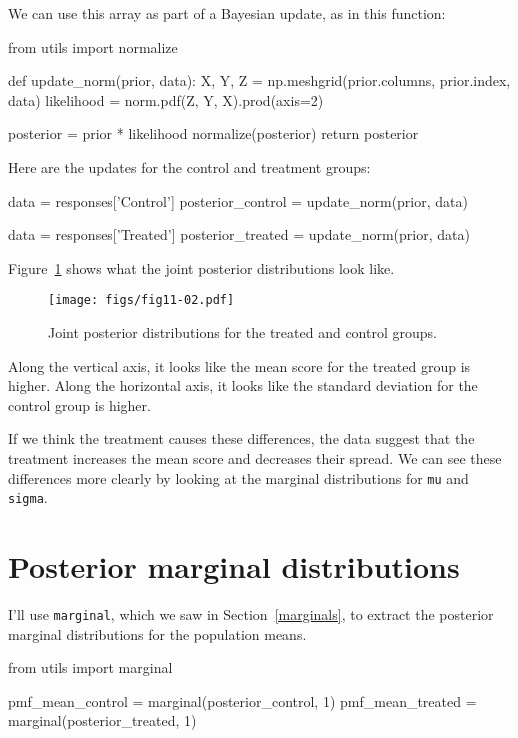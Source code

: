 \documentclass[12pt]{book}
\theoremstyle{exercise}
\newcommand{\py}[1]{{\tt #1}}%
\begin{document}
We can use this array as part of a Bayesian update, as in this function:

\begin{code}
from utils import normalize

def update_norm(prior, data):
    X, Y, Z = np.meshgrid(prior.columns, prior.index, data)
    likelihood = norm.pdf(Z, Y, X).prod(axis=2)

    posterior = prior * likelihood
    normalize(posterior)
    return posterior
\end{code}

Here are the updates for the control and treatment groups:

\begin{code}
data = responses['Control']
posterior_control = update_norm(prior, data)

data = responses['Treated']
posterior_treated = update_norm(prior, data)
\end{code}

Figure~\ref{fig11-02} shows what the joint posterior distributions look like.

\begin{figure}
\centerline{\texttt{[image: figs/fig11-02.pdf]}}
\caption{Joint posterior distributions for the treated and control groups.}
\label{fig11-02}
\end{figure}

Along the vertical axis, it looks like the mean score for the treated
group is higher. Along the horizontal axis, it looks like the standard
deviation for the control group is higher.

If we think the treatment causes these differences, the data suggest
that the treatment increases the mean score and decreases their spread.
We can see these differences more clearly by looking at the marginal
distributions for \py{mu} and
\py{sigma}.

\section{Posterior marginal distributions}

I'll use \py{marginal}, which we saw in Section~\ref{marginals},
to extract the posterior marginal distributions for the population means.

\begin{code}
from utils import marginal

pmf_mean_control = marginal(posterior_control, 1)
pmf_mean_treated = marginal(posterior_treated, 1)
\end{code}
\end{document}
